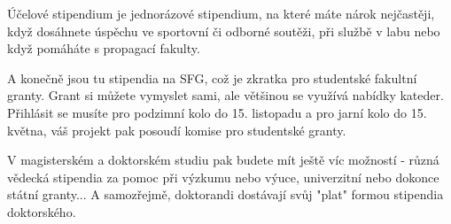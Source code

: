 Účelové stipendium je jednorázové stipendium, na které máte nárok nejčastěji,
když dosáhnete úspěchu ve sportovní či odborné soutěži, při službě v labu nebo
když pomáháte s propagací fakulty.

A konečně jsou tu stipendia na SFG, což je zkratka pro studentské fakultní granty. Grant si můžete vymyslet sami, ale většinou se využívá nabídky kateder.
Přihlásit se musíte pro podzimní kolo do 15. listopadu a pro jarní kolo do 15. května, váš projekt pak posoudí komise pro studentské granty.

V magisterském a doktorském studiu pak budete mít ještě víc možností - různá
vědecká stipendia za pomoc při výzkumu nebo výuce, univerzitní nebo dokonce
státní granty... A samozřejmě, doktorandi dostávají svůj "plat" formou stipendia
doktorského.